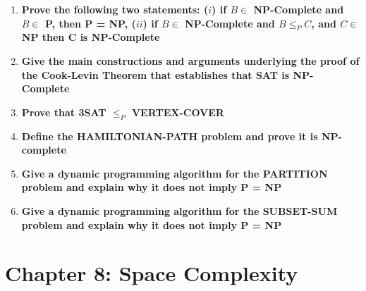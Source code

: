 \documentclass{article}
\begin{document}
\begin{enumerate}{}
\item \textbf{Prove the following two statements: ($i$) if $B \in$ NP-Complete and $B \in$ P, then P = NP, ($ii$) if $B \in$ NP-Complete and $B \leq_{P} C$, and $C \in$ NP then C is NP-Complete}

\item \textbf{Give the main constructions and arguments underlying the proof of the Cook-Levin Theorem that establishes that SAT is NP-Complete}

\item \textbf{Prove that 3SAT $\leq_P$ VERTEX-COVER}

\item \textbf{Define the HAMILTONIAN-PATH problem and prove it is NP-complete}

\item \textbf{Give a dynamic programming algorithm for the PARTITION problem and explain why it does not imply P = NP}

\item \textbf{Give a dynamic programming algorithm for the SUBSET-SUM problem and explain why it does not imply P = NP}

\end{enumerate}

\clearpage
\section{Chapter 8: Space Complexity}
\end{document}
